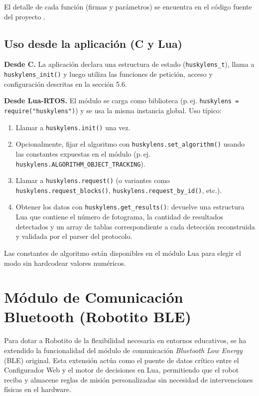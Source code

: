 \documentclass{prgrado}
\begin{document}
El detalle de cada función (firmas y parámetros) se encuentra en el código fuente del proyecto \cite{robotito2026hardware}.


\section{Uso desde la aplicación (C y Lua)}

\textbf{Desde C.} La aplicación declara una estructura de estado (\texttt{huskylens\_t}), llama a \texttt{huskylens\_init()} y luego utiliza las funciones de petición, acceso y configuración descritas en la sección 5.6.

\textbf{Desde Lua-RTOS.} El módulo se carga como biblioteca (p.\,ej. \texttt{huskylens = require("huskylens")}) y se usa la misma instancia global. Uso típico:
\begin{enumerate}[noitemsep]
  \item Llamar a \texttt{huskylens.init()} una vez.
  \item Opcionalmente, fijar el algoritmo con \texttt{huskylens.set\_algorithm()} usando las constantes expuestas en el módulo (p.\,ej. \texttt{huskylens.ALGORITHM\_OBJECT\_TRACKING}).
  \item Llamar a \texttt{huskylens.request()} (o variantes como \texttt{huskylens.request\_blocks()}, \texttt{huskylens.request\_by\_id()}, etc.).
  \item Obtener los datos con \texttt{huskylens.get\_results()}: devuelve una estructura Lua que contiene el número de fotograma,
la cantidad de resultados detectados y un array de tablas
correspondiente a cada detección reconstruida y validada por el parser
del protocolo.
\end{enumerate}
Las constantes de algoritmo están disponibles en el módulo Lua para elegir el modo sin hardcodear valores numéricos.

\chapter{Módulo de Comunicación Bluetooth (Robotito BLE)}

Para dotar a Robotito de la flexibilidad necesaria en entornos educativos, se ha extendido la funcionalidad del módulo de comunicación \textit{Bluetooth Low Energy} (BLE) original. Esta extensión actúa como el puente de datos crítico entre el Configurador Web y el motor de decisiones en Lua, permitiendo que el robot reciba y almacene reglas de misión personalizadas sin necesidad de intervenciones físicas en el hardware.
\end{document}
